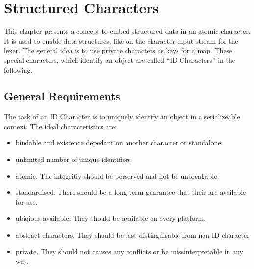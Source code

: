 \chapter{Structured Characters}
This chapter presents a concept to embed structured data in an atomic character. It is used to enable data structures, like  on the character input stream for the lexer. The general idea is to use private characters as keys for a map. These special characters, which identify an object are called ``ID Characters'' in the following.

\section{General Requirements}
The task of an ID Character is to uniquely identify an object in a serializeable context. 
The ideal characteristics are:
\begin{itemize}
	\item bindable and existence depedant on another character or standalone
	\item unlimited number of unique identifiers
	\item atomic. The integritiy should be perserved and not be unbreakable.
	\item standardised. There should be a long term guarantee that their are available for use.
	\item ubiqious available. They should be available on every platform.
	\item abstract characters. They should be fast distinguisable from non ID character
	\item private. They should not causes any conflicts or be missinterpretable in any way.
\end{itemize}

